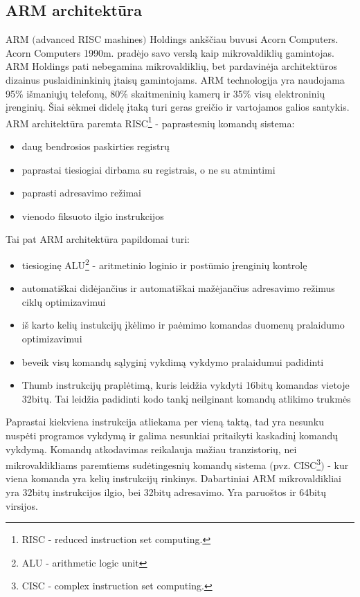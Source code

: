 \documentclass[a4paper, 12pt]{article} %
\begin{document}
\begin{onehalfspacing}
\newpage

\section{ARM architekt\={u}ra}
ARM $($advanced RISC mashines$)$ Holdings ank\v{s}\v{c}iau buvusi Acorn Computers. Acorn Computers 1990m. prad\.{e}jo savo versl\k{a} kaip mikrovaldikli\k{u} gamintojas. ARM Holdings pati nebegamina mikrovaldikli\k{u}, bet pardavin\.{e}ja architekt\={u}ros dizainus puslaidininkini\k{u} \k{i}tais\k{u} gamintojams. ARM technologija yra naudojama 95\% i\v{s}mani\k{u}j\k{u} telefon\k{u}, 80\% skaitmenini\k{u} kamer\k{u} ir 35\% vis\k{u} elektronini\k{u} \k{i}rengini\k{u}. \v{S}iai s\.{e}kmei didel\k{e} \k{i}tak\k{a} turi geras grei\v{c}io ir vartojamos galios santykis.    \\
\indent ARM architekt\={u}ra paremta RISC\footnote{RISC - reduced instruction set computing.} - paprastesni\k{u} komand\k{u} sistema:
\begin{itemize} 
\item daug bendrosios paskirties registr\k{u}
\item paprastai tiesiogiai dirbama su registrais, o ne su atmintimi
\item paprasti adresavimo re\v{z}imai
\item vienodo fiksuoto ilgio instrukcijos
\end{itemize} 
Tai pat ARM architekt\={u}ra papildomai turi:
\begin{itemize}
\item tiesiogin\k{e} ALU\footnote{ALU - arithmetic logic unit} - aritmetinio loginio ir post\={u}mio \k{i}rengini\k{u} kontrol\k{e}
\item automati\v{s}kai did\.{e}jan\v{c}ius ir automati\v{s}kai ma\v{z}\.{e}jan\v{c}ius adresavimo re\v{z}imus cikl\k{u} optimizavimui
\item i\v{s} karto keli\k{u} instukcij\k{u} \k{i}k\.elimo ir pa\.{e}mimo komandas duomen\k{u} pralaidumo optimizavimui
\item beveik vis\k{u} komand\k{u} s\k{a}lygin\k{i} vykdim\k{a} vykdymo pralaidumui padidinti
\item Thumb instrukcij\k{u} prapl\.{e}tim\k{a}, kuris leid\v{z}ia vykdyti 16bit\k{u} komandas vietoje 32bit\k{u}. Tai leid\v{z}ia padidinti kodo tank\k{i} neilginant komand\k{u} atlikimo trukm\.{e}s
\end{itemize}
Paprastai kiekviena instrukcija atliekama per vien\k{a} takt\k{a}, tad yra nesunku nusp\.{e}ti programos vykdym\k{a} ir galima nesunkiai pritaikyti kaskadin\k{i} komand\k{u} vykdym\k{a}. Komand\k{u} atkodavimas reikalauja ma\v{z}iau tranzistori\k{u}, nei mikrovaldikliams paremtiems sud\.{e}tingesni\k{u} komand\k{u} sistema $($pvz. CISC\footnote{CISC - complex instruction set computing.}$)$ - kur viena komanda yra keli\k{u} instrukcij\k{u} rinkinys. Dabartiniai ARM mikrovaldikliai yra 32bit\k{u} instrukcijos ilgio, bei 32bit\k{u} adresavimo. Yra paruo\v{s}tos ir 64bit\k{u} virsijos. \\

\end{onehalfspacing}
\end{document}
